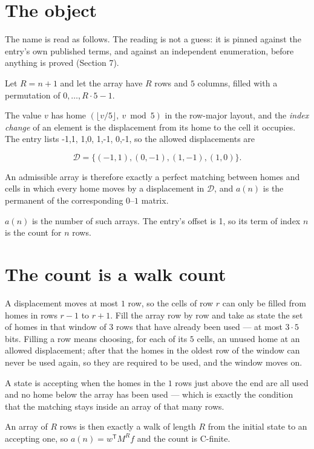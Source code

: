 \documentclass[11pt]{article}
\theoremstyle{definition}
\begin{document}
\section{The object}

The name is read as follows. The reading is not a guess: it is pinned against the entry's own published terms, and against an independent enumeration, before anything is proved (Section 7).

Let $R = n + 1$ and let the array have $R$ rows and $5$ columns, filled with a permutation of $0,\dots,R\cdot5-1$.

The value $v$ has home $(\lfloor v/5\rfloor,\ v \bmod 5)$ in the row-major layout, and the {\itshape index change} of an element is the displacement from its home to the cell it occupies. The entry lists -1,1, 1,0, 1,-1, 0,-1, so the allowed displacements are

\[\mathcal{D} = \{(-1,1), (0,-1), (1,-1), (1,0)\}.\]

An admissible array is therefore exactly a perfect matching between homes and cells in which every home moves by a displacement in $\mathcal{D}$, and $a(n)$ is the permanent of the corresponding $0$--$1$ matrix.

$a(n)$ is the number of such arrays. The entry's offset is 1, so its term of index $n$ is the count for $n$ rows.

\section{The count is a walk count}

A displacement moves at most $1$ row, so the cells of row $r$ can only be filled from homes in rows $r-1$ to $r+1$. Fill the array row by row and take as state the set of homes in that window of $3$ rows that have already been used --- at most $3\cdot5$ bits. Filling a row means choosing, for each of its $5$ cells, an unused home at an allowed displacement; after that the homes in the oldest row of the window can never be used again, so they are required to be used, and the window moves on.

A state is accepting when the homes in the $1$ rows just above the end are all used and no home below the array has been used --- which is exactly the condition that the matching stays inside an array of that many rows.

An array of $R$ rows is then exactly a walk of length $R$ from the initial state to an accepting one, so $a(n) = w^{\mathsf T}M^{R}f$ and the count is C-finite.
\end{document}
